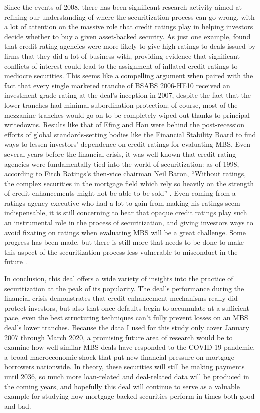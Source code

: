 \documentclass[12pt]{article}
\begin{document}
Since the events of 2008, there has been significant research activity aimed at refining our understanding of where the securitization process can go wrong, with a lot of attention on the massive role that credit ratings play in helping investors decide whether to buy a given asset-backed security. As just one example, \textcite{efing14} found that credit rating agencies were more likely to give high ratings to deals issued by firms that they did a lot of business with, providing evidence that significant conflicts of interest could lead to the assignment of inflated credit ratings to mediocre securities. This seems like a compelling argument when paired with the fact that every single marketed tranche of BSABS 2006-HE10 received an investment-grade rating at the deal’s inception in 2007, despite the fact that the lower tranches had minimal subordination protection; of course, most of the mezzanine tranches would go on to be completely wiped out thanks to principal writedowns. Results like that of Efing and Hau were behind the post-recession efforts of global standards-setting bodies like the Financial Stability Board to find ways to lessen investors’ dependence on credit ratings for evaluating MBS. Even several years before the financial crisis, it was well known that credit rating agencies were fundamentally tied into the world of securitization: as of 1998, according to Fitch Ratings’s then-vice chairman Neil Baron, “Without ratings, the complex securities in the mortgage field which rely so heavily on the strength of credit enhancements might not be able to be sold” \parencite{baron98}. Even coming from a ratings agency executive who had a lot to gain from making his ratings seem indispensable, it is still concerning to hear that opaque credit ratings play such an instrumental role in the process of securitization, and giving investors ways to avoid fixating on ratings when evaluating MBS will be a great challenge. Some progress has been made, but there is still more that needs to be done to make this aspect of the securitization process less vulnerable to misconduct in the future \parencite{scheicher17}.

In conclusion, this deal offers a wide variety of insights into the practice of securitization at the peak of its popularity. The deal's performance during the financial crisis demonstrates that credit enhancement mechanisms really did protect investors, but also that once defaults begin to accumulate at a sufficient pace, even the best structuring techniques can’t fully prevent losses on an MBS deal’s lower tranches. Because the data I used for this study only cover January 2007 through March 2020, a promising future area of research would be to examine how well similar MBS deals have responded to the COVID-19 pandemic, a broad macroeconomic shock that put new financial pressure on mortgage borrowers nationwide. In theory, these securities will still be making payments until 2036, so much more loan-related and deal-related data will be produced in the coming years, and hopefully this deal will continue to serve as a valuable example for studying how mortgage-backed securities perform in times both good and bad.

\newpage

\nocite{*}
\printbibliography
\end{document}
